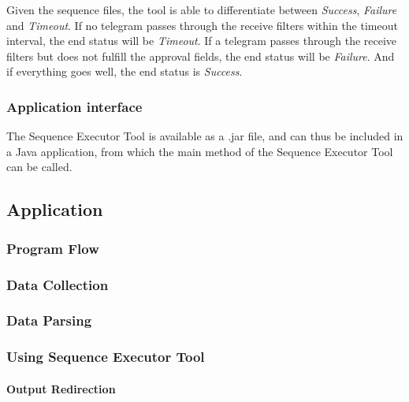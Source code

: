 \documentclass[Main]{subfiles}
\begin{document}
			Given the sequence files, the tool is able to differentiate between \emph{Success}, \emph{Failure} and \emph{Timeout}.
			If no telegram passes through the receive filters within the timeout interval, the end status will be \emph{Timeout}.
			If a telegram passes through the receive filters but does not fulfill the approval fields, the end status will be \emph{Failure}.
			And if everything goes well, the end status is \emph{Success}.

		\subsubsection{Application interface}
			The Sequence Executor Tool is available as a .jar file, and can thus be included in a Java application, from which the main method of the Sequence Executor Tool can be called.


	\subsection{Application}
		\subsubsection{Program Flow}
		\label{sub:program_flow}


		\subsubsection{Data Collection}
		\label{sub:data_collection}


		\subsubsection{Data Parsing}
		\label{sub:data_parsing}


		\subsubsection{Using Sequence Executor Tool} %
		\label{sub:using_sequence_executor_tool}
			

			\paragraph{Output Redirection} %
			\label{par:output_redirection}
				
\end{document}
